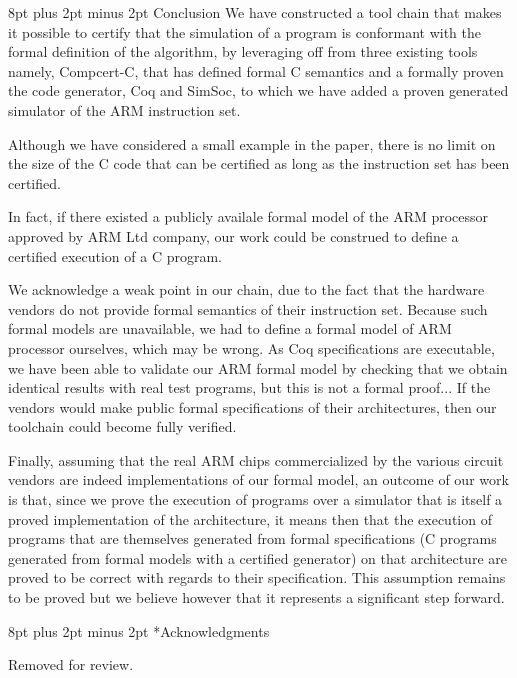 \documentclass[twocolumn]{article}
\makeatletter
\def\section{\@startsection {section}{1}{\z@}{20pt plus 2pt minus 2pt}
{8pt plus 2pt minus 2pt}{\centering\normalsize\sc
\edef\@svsec{\thesection.\ }}}
\def\thesection{\Roman{section}}
\makeatother
\begin{document}
\section{Conclusion}
\label{conclusion}
We have constructed a tool chain that makes it possible to certify
that the simulation of a program is conformant with the formal
definition of the algorithm, by leveraging off from three existing
tools namely, Compcert-C, that has defined formal C semantics and a
formally proven the code generator, Coq and SimSoc, to which we have
added a proven generated simulator of the ARM instruction set.

Although we have considered a small example in the paper, there is no
limit on the size of the C code that can be certified as long as
the instruction set has been certified.

In fact, if there existed a publicly availale formal model of the ARM
processor approved by ARM Ltd company, our work could be construed
to define a certified execution of a C program.

We acknowledge a weak point in our chain, due to the fact that the
hardware vendors do not provide formal semantics of their instruction
set. Because such formal models are unavailable, we had to define a
formal model of ARM processor ourselves, which may be wrong.  As Coq
specifications are executable, we have been able to validate our ARM
formal model by checking that we obtain identical results with real
test programs, but this is not a formal proof... If the vendors would
make public formal specifications of their architectures, then our
toolchain could become fully verified.

Finally, assuming that the real ARM chips commercialized by the
various circuit vendors are indeed implementations of our formal
model, an outcome of our work is that, since we prove the execution of
programs over a simulator that is itself a proved implementation of
the architecture, it means then that the execution of programs that
are themselves generated from formal specifications (C programs
generated from formal models with a certified generator) on that
architecture are proved to be correct with regards to their
specification. This assumption remains to be proved but we believe
however that it represents a significant step forward.


\section*{Acknowledgments}

Removed for review.





\end{document}
